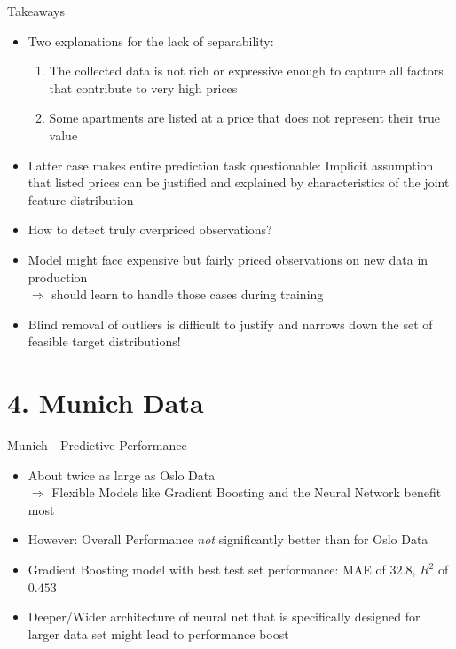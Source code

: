 \documentclass[ngerman,inputenc]{beamer}
\begin{document}
\begin{frame}{Takeaways}
  \begin{itemize}
    \item Two explanations for the lack of separability:
          \begin{enumerate}
            \item The collected data is not rich or expressive enough to capture all factors that contribute to very high prices
            \item Some apartments are listed at a price that does not represent their true value
          \end{enumerate}
    \item Latter case makes entire prediction task questionable: Implicit assumption that listed prices can be justified and explained by characteristics of the joint feature distribution
    \item How to detect truly overpriced observations?
    \item Model might face expensive but fairly priced observations on new data in production \\
          $\Rightarrow$ should learn to handle those cases during training
    \item Blind removal of outliers is difficult to justify and narrows down the set of feasible target distributions!
  \end{itemize}
\end{frame}


\section{4. Munich Data}

\begin{frame}{Munich - Predictive Performance}
  \begin{itemize}
    \item About twice as large as Oslo Data \\
          $\Rightarrow$ Flexible Models like Gradient Boosting and the Neural Network benefit most
    \item However: Overall Performance \emph{not} significantly better than for Oslo Data
    \item Gradient Boosting model with best test set performance: MAE of $32.8$, $R^2$ of $0.453$
    \item Deeper/Wider architecture of neural net that is specifically designed for larger data set might lead to performance boost
  \end{itemize}
\end{frame}
\end{document}
